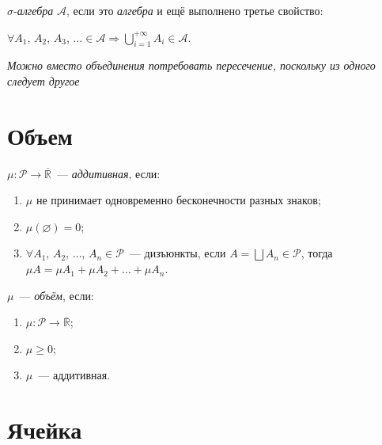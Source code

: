 \documentclass{article}
\begin{document}
        $\sigma$-\textit{алгебра} $\mathcal{A}$, если это \textit{алгебра} и ещё выполнено третье свойство:
        
            $\forall A_1$, $A_2$, $A_3$, $\ldots \in \mathcal{A} \Rightarrow \bigcup\limits_{i = 1}^{+\infty} A_i \in \mathcal{A}$.
            
        \textit{Можно вместо объединения потребовать пересечение, поскольку из одного следует другое}
        
    \newpage
    
    \section{Объем}
    
        $\mu : \mathcal{P} \rightarrow \overline{\mathbb{R}}$~--- \textit{аддитивная}, если:
        
        \begin{enumerate}
        
            \item $\mu$ не принимает одновременно бесконечности разных знаков;
            
            \item $\mu(\varnothing) = 0$;
            
            \item $\forall A_1$, $A_2$, $\ldots$, $A_n \in \mathcal{P}$~--- дизъюнкты, если $A = \bigsqcup A_n \in \mathcal{P}$, тогда $\mu A = \mu A_1 + \mu A_2 + \ldots + \mu A_n$.
        
        \end{enumerate}
        
        $\mu$~--- \textit{объём}, если:
        
        \begin{enumerate}
        
            \item $\mu : \mathcal{P} \rightarrow \overline{\mathbb{R}}$;
            
            \item $\mu \geq 0$;
            
            \item $\mu$~--- аддитивная.
            
        \end{enumerate}
        
    \newpage
    
    \section{Ячейка}
    
\end{document}
